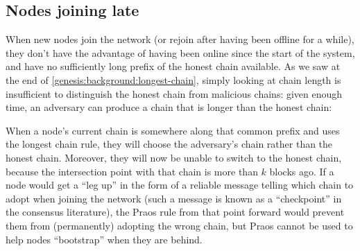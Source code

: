 \subsection{Nodes joining late}
\label{genesis:background:joining-late}

When new nodes join the network (or rejoin after having been offline for a
while), they don't have the advantage of having been online since the start of
the system, and have no sufficiently long prefix of the honest chain available.
As we saw at the end of \cref{genesis:background:longest-chain}, simply looking
at chain length is insufficient to distinguish the honest chain from malicious
chains: given enough time, an adversary can produce a chain that is longer than
the honest chain:
%
\begin{center}
\end{center}
%
When a node's current chain is somewhere along that common prefix and uses the
longest chain rule, they will choose the adversary's chain rather than the
honest chain. Moreover, they will now be unable to switch to the honest chain,
because the intersection point with that chain is more than $k$ blocks ago. If a
node would get a ``leg up'' in the form of a reliable message telling which
chain to adopt when joining the network (such a message is known as a
``checkpoint'' in the consensus literature), the Praos rule from that point
forward would prevent them from (permanently) adopting the wrong chain, but
Praos cannot be used to help nodes ``bootstrap'' when they are behind.

